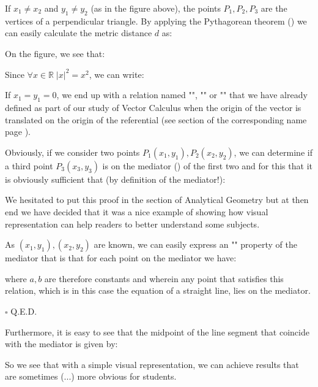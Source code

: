 If $x_1\neq x_2$ and $y_1\neq y_2$ (as in the figure above), the points $P_1,P_2,P_3$ are the vertices of a perpendicular triangle. By applying the Pythagorean theorem () we can easily calculate the metric distance $d$ as:
	
	On the figure, we see that:
	
	Since $\forall x \in \mathbb{R} \; \vert x \vert ^2 =x^2$, we can write:
	
	If $x_1=y_1=0$, we end up with a relation named "", "" or "" that we have already defined as part of our study of Vector Calculus when the origin of the vector is translated on the origin of the referential (see section of the corresponding name page \pageref{vector norm}).
	
	\begin{theorem}
	Obviously, if we consider two points $P_1(x_1,y_1),P_2(x_2,y_2)$, we can determine if a third point $P_3(x_3,y_3)$ is on the mediator () of the first two and for this that it is obviously sufficient that (by definition of the mediator!):
	
	\end{theorem}
	\begin{tcolorbox}[title=Remark,colframe=black,arc=10pt]
	We hesitated to put this proof in the section of Analytical Geometry but at then end we have decided that it was a nice example of showing how visual representation can help readers to better understand some subjects.
	\end{tcolorbox}	
	\begin{dem}
	As $(x_1,y_1),(x_2,y_2)$ are known, we can easily express an "" property of the mediator that is that for each point on the mediator we have:
	
	where $a, b$ are therefore constants and wherein any point that satisfies this relation, which is in this case the equation of a straight line, lies on the mediator.
	\begin{flushright}
		$\square$  Q.E.D.
	\end{flushright}
	\end{dem}
	Furthermore, it is easy to see that the midpoint of the line segment that coincide with the mediator is given by:
	
	So we see that with a simple visual representation, we can achieve results that are sometimes (...) more obvious for students.
	
